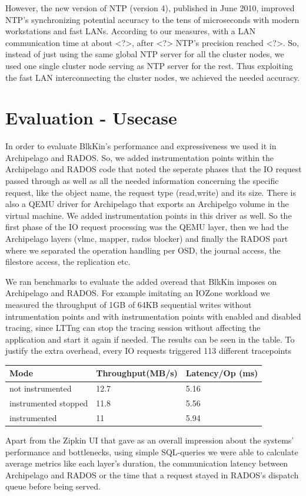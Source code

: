 \documentclass[a4paper,10pt,twocolumn]{article}
\begin{document}
However, the new version of NTP (version 4), published in June 2010, improved
NTP's synchronizing potential accuracy to the tens of microseconds with modern
workstations and fast LANs. According to our measures, with a LAN communication
time at about <?>, after <?> NTP's precision reached <?>.  So, instead of just
using the same global NTP server for all the cluster nodes, we used one single
cluster node serving as NTP server for the rest. Thus exploiting the fast LAN
interconnecting the cluster nodes, we achieved the needed accuracy.
 
\section{Evaluation - Usecase} In order to evaluate BlkKin's performance and
expressiveness we used it in Archipelago and RADOS. So, we added instrumentation
points within the Archipelago and RADOS code that noted the seperate phases that
the IO request passed through as well as all the needed information concerning
the specific request, like the object name, the request type (read,write) and
its size. There is also a QEMU driver for Archipelago that exports an Archipelgo
volume in the virtual machine. We added instrumentation points in this driver as
well. So the first phase of the IO request processing was the QEMU layer, then
we had the Archipelago layers (vlmc, mapper, rados blocker) and finally the
RADOS part where we separated the operation handling per OSD, the journal
access, the filestore access, the replication etc.

We ran benchmarks to evaluate the added overead that BlkKin imposes on
Archipelago and RADOS. For example imitating an IOZone workload we measured the
throughput of 1GB of 64KB sequential writes without intrumentation points and
with instrumentation points with enabled and disabled tracing, since LTTng can
stop the tracing session without affecting the application and start it again if
needed. The results can be seen in the table. To justify the extra overhead, every IO requests triggered 113 different
tracepoints

\begin{center}
\begin{tabular}{| l | p{3cm} | p{2cm} |}
    \hline
    Mode & Throughput(MB/s) & Latency/Op (ms)  \\ \hline
    not instrumented & 12.7 & 5.16  \\ \hline
    instrumented stopped & 11.8 &  5.56  \\ \hline
    instrumented & 11 & 5.94  \\ 
    \hline
    \end{tabular}
\end{center}
Apart from the Zipkin UI that gave as an overall impression about the systems'
performance and bottlenecks, using simple SQL-queries we were able to calculate
average metrics like each layer's duration, the communication latency between
Archipelago and RADOS or the time that a request stayed in RADOS's dispatch
queue before being served.   
\end{document}
